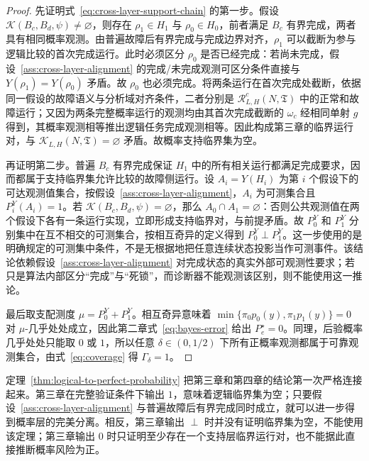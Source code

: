 \documentclass[master,fontset=ubuntu]{shnuthesis}
\DeclareRobustCommand{\logicstatus}[1]{\ensuremath{#1}}
\theoremstyle{definition}
\begin{document}
\begin{proof}
先证明式~\eqref{eq:cross-layer-support-chain} 的第一步。假设 \(\mathcal K(B_c,B_d,\psi)\neq\varnothing\)，则存在 \(\rho_1\in H_1\) 与 \(\rho_0\in H_0\)，前者满足 \(B_c\) 有界完成，两者具有相同概率观测。由普遍故障后有界完成与完成边界对齐，\(\rho_1\) 可以截断为参与逻辑比较的首次完成运行。此时必须区分 \(\rho_0\) 是否已经完成：若尚未完成，假设~\ref{ass:cross-layer-alignment} 的完成/未完成观测可区分条件直接与 \(Y(\rho_1)=Y(\rho_0)\) 矛盾。故 \(\rho_0\) 也必须完成。将两条运行在首次完成处截断，依据同一假设的故障语义与分析域对齐条件，二者分别是 \(\mathcal R^c_{L,H}(N,\mathfrak T)\) 中的正常和故障运行；又因为两条完整概率运行的观测均由其首次完成截断的 \(\omega_c\) 经相同单射 \(g\) 得到，其概率观测相等推出逻辑任务完成观测相等。因此构成第三章的临界运行对，与 \(\mathcal K_{L,H}(N,\mathfrak T)=\varnothing\) 矛盾。故概率支持临界集为空。

再证明第二步。普遍 $B_c$ 有界完成保证 $H_1$ 中的所有相关运行都满足完成要求，因而都属于支持临界集允许比较的故障侧运行。设 $A_i=Y(H_i)$ 为第 $i$ 个假设下的可达观测值集合，按假设~\ref{ass:cross-layer-alignment}，$A_i$ 为可测集合且 $P_i^Y(A_i)=1$。若 $\mathcal K(B_c,B_d,\psi)=\varnothing$，那么 $A_0\cap A_1=\varnothing$：否则公共观测值在两个假设下各有一条运行实现，立即形成支持临界对，与前提矛盾。故 $P_0^Y$ 和 $P_1^Y$ 分别集中在互不相交的可测集合，按相互奇异的定义得到 $P_0^Y\perp P_1^Y$。这一步使用的是明确规定的可测集中条件，不是无根据地把任意连续状态投影当作可测事件。该结论依赖假设~\ref{ass:cross-layer-alignment} 对完成状态的真实外部可观测性要求；若只是算法内部区分“完成”与“死锁”，而诊断器不能观测该区别，则不能使用这一推论。

最后取支配测度 \(\mu=P_0^Y+P_1^Y\)。相互奇异意味着
\(\min\{\pi_0p_0(y),\pi_1p_1(y)\}=0\) 对 \(\mu\)-几乎处处成立，因此第二章式~\eqref{eq:bayes-error} 给出 \(P_e^\star=0\)。同理，后验概率几乎处处只能取 \(0\) 或 \(1\)，所以任意 \(\delta\in(0,1/2)\) 下所有正概率观测都属于可靠观测集合，由式~\eqref{eq:coverage} 得 \(\Gamma_\delta=1\)。
\end{proof}

定理~\ref{thm:logical-to-perfect-probability} 把第三章和第四章的结论第一次严格连接起来。第三章在完整验证条件下输出 \logicstatus{1}，意味着逻辑临界集为空；只要假设~\ref{ass:cross-layer-alignment} 与普遍故障后有界完成同时成立，就可以进一步得到概率层的完美分离。相反，第三章输出 \logicstatus{\perp} 时并没有证明临界集为空，不能使用该定理；第三章输出 \logicstatus{0} 时只证明至少存在一个支持层临界运行对，也不能据此直接推断概率风险为正。
\end{document}
